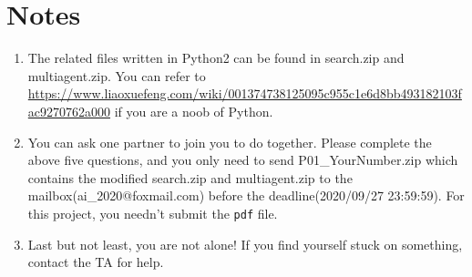 \documentclass[a4paper, 11pt]{article}
\begin{document}
\section{Notes}
\begin{enumerate}\setlength{\itemsep}{-\itemsep}
  \item The related files written in Python2 can be found in \textsf{search.zip} and \textsf{multiagent.zip}. You can refer to \url{https://www.liaoxuefeng.com/wiki/001374738125095c955c1e6d8bb493182103fac9270762a000} if you are a noob of Python.
\item You can ask one partner to join you to do together. Please complete the above five questions, and you only need to send \textsf{P01\_YourNumber.zip} which contains the modified \textsf{search.zip} and \textsf{multiagent.zip} to the mailbox(\textsf{ai\_2020@foxmail.com}) before the deadline(2020/09/27 23:59:59). For this project, you needn't submit the \texttt{pdf} file.
\item Last but not least, you are not alone! If you find yourself stuck on something, contact the TA for help.
  
\end{enumerate}
  
\end{document}

